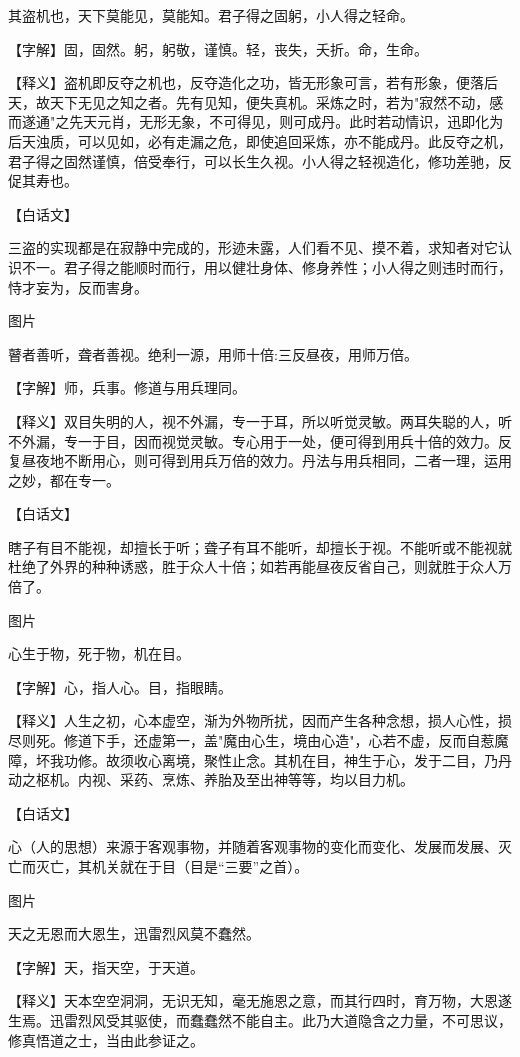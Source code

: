\documentclass[12pt,UTF8]{ctexbook}
\begin{document}
其盗机也，天下莫能见，莫能知。君子得之固躬，小人得之轻命。


【字解】固，固然。躬，躬敬，谨慎。轻，丧失，夭折。命，生命。


【释义】盗机即反夺之机也，反夺造化之功，皆无形象可言，若有形象，便落后天，故天下无见之知之者。先有见知，便失真机。采炼之时，若为"寂然不动，感而遂通"之先天元肖，无形无象，不可得见，则可成丹。此时若动情识，迅即化为后天浊质，可以见如，必有走漏之危，即使追回采炼，亦不能成丹。此反夺之机，君子得之固然谨慎，倍受奉行，可以长生久视。小人得之轻视造化，修功差驰，反促其寿也。


【白话文】


三盗的实现都是在寂静中完成的，形迹未露，人们看不见、摸不着，求知者对它认识不一。君子得之能顺时而行，用以健壮身体、修身养性；小人得之则违时而行，恃才妄为，反而害身。


图片​


瞽者善听，聋者善视。绝利一源，用师十倍:三反昼夜，用师万倍。


【字解】师，兵事。修道与用兵理同。


【释义】双目失明的人，视不外漏，专一于耳，所以听觉灵敏。两耳失聪的人，听不外漏，专一于目，因而视觉灵敏。专心用于一处，便可得到用兵十倍的效力。反复昼夜地不断用心，则可得到用兵万倍的效力。丹法与用兵相同，二者一理，运用之妙，都在专一。


【白话文】


瞎子有目不能视，却擅长于听；聋子有耳不能听，却擅长于视。不能听或不能视就杜绝了外界的种种诱惑，胜于众人十倍；如若再能昼夜反省自己，则就胜于众人万倍了。

图片​


心生于物，死于物，机在目。


【字解】心，指人心。目，指眼睛。


【释义】人生之初，心本虚空，渐为外物所扰，因而产生各种念想，损人心性，损尽则死。修道下手，还虚第一，盖"魔由心生，境由心造"，心若不虚，反而自惹魔障，坏我功修。故须收心离境，聚性止念。其机在目，神生于心，发于二目，乃丹动之枢机。内视、采药、烹炼、养胎及至出神等等，均以目力机。


【白话文】


心（人的思想）来源于客观事物，并随着客观事物的变化而变化、发展而发展、灭亡而灭亡，其机关就在于目（目是“三要”之首）。


图片​


天之无恩而大恩生，迅雷烈风莫不蠢然。


【字解】天，指天空，于天道。


【释义】天本空空洞洞，无识无知，毫无施恩之意，而其行四时，育万物，大恩遂生焉。迅雷烈风受其驱使，而蠢蠢然不能自主。此乃大道隐含之力量，不可思议，修真悟道之士，当由此参证之。
\end{document}
